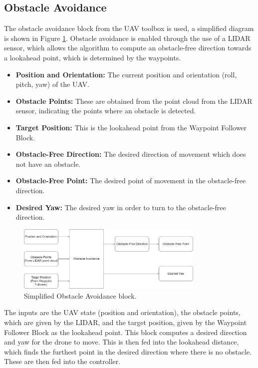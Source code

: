 \subsection{Obstacle Avoidance}
The obstacle avoidance block from the UAV toolbox is used, a simplified diagram is shown in Figure \ref{fig:obs_avoid}. Obstacle avoidance is enabled through the use of a LIDAR sensor, which allows the algorithm to compute an obstacle-free direction towards a lookahead point, which is determined by the waypoints.
\begin{itemize}
    \item \textbf{Position and Orientation:} The current position and orientation (roll, pitch, yaw) of the UAV.
    \item \textbf{Obstacle Points:} These are obtained from the point cloud from the LIDAR sensor, indicating the points where an obstacle is detected.
    \item \textbf{Target Position:} This is the lookahead point from the Waypoint Follower Block.
    \item \textbf{Obstacle-Free Direction:} The desired direction of movement which does not have an obstacle.
    \item \textbf{Obstacle-Free Point:} The desired point of movement in the obstacle-free direction.
    \item \textbf{Desired Yaw:} The desired yaw in order to turn to the obstacle-free direction.
\end{itemize}
\begin{figure}[H]
    \centering
    \includegraphics[width = 0.8\textwidth]{./img/obs_avoid.png}
    \caption{Simplified Obstacle Avoidance block.}
    \label{fig:obs_avoid}
\end{figure}
The inputs are the UAV state (position and orientation), the obstacle points, which are given by the LIDAR, and the target position, given by the Waypoint Follower Block as the lookahead point. This block computes a desired direction and yaw for the drone to move. This is then fed into the lookahead distance, which finds the furthest point in the desired direction where there is no obstacle. These are then fed into the controller.

